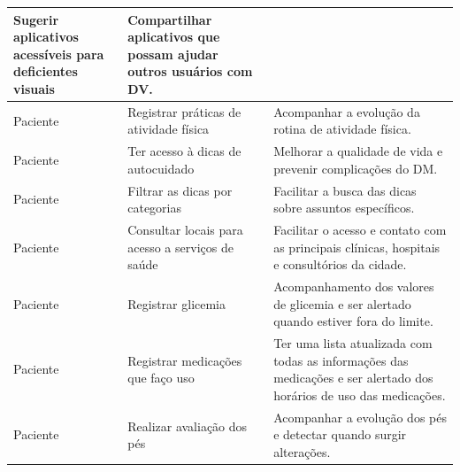 \begin{quadro}[htb]
\begin{center}
\begin{tabular}{|p{2.0cm}|p{5.0cm}|p{7.0cm}|}
            Sugerir aplicativos acessíveis para deficientes visuais        &
            Compartilhar aplicativos que possam ajudar outros usuários com DV\@.                                                \\
            \hline
            Paciente                                                       &
            Registrar práticas de atividade física                         &
            Acompanhar a evolução da rotina de atividade física.                                                                \\
            \hline
            Paciente                                                       &
            Ter acesso à dicas de autocuidado                              &
            Melhorar a qualidade de vida e prevenir complicações do DM\@.                                                       \\
            \hline
            Paciente                                                       &
            Filtrar as dicas por categorias                                &
            Facilitar a busca das dicas sobre assuntos específicos.                                                             \\
            \hline
            Paciente                                                       &
            Consultar locais para acesso a serviços de saúde               &
            Facilitar o acesso e contato com as principais clínicas, hospitais e consultórios da cidade.                        \\
            \hline
            Paciente                                                       &
            Registrar glicemia                                             &
            Acompanhamento dos valores de glicemia e ser alertado quando estiver fora do limite.                                \\
            \hline
            Paciente                                                       &
            Registrar medicações que faço uso                              &
            Ter uma lista atualizada com todas as informações das medicações e ser alertado dos horários de uso das medicações. \\
            \hline
            Paciente                                                       &
            Realizar avaliação dos pés                                     &
            Acompanhar a evolução dos pés e detectar quando surgir alterações.                                                  \\

\end{tabular}
\end{center}
\end{quadro}
